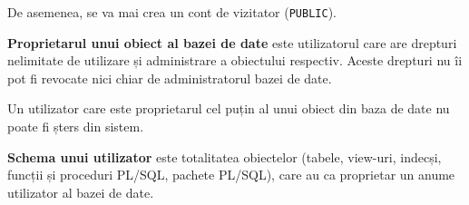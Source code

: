 De asemenea, se va mai crea un cont de vizitator (\texttt{PUBLIC}).

\textbf{Proprietarul unui obiect al bazei de date} este utilizatorul
care are drepturi nelimitate de utilizare și administrare a obiectului
respectiv. Aceste drepturi nu îi pot fi revocate nici chiar de administratorul
bazei de date.

Un utilizator care este proprietarul cel puțin al unui obiect din baza
de date nu poate fi șters din sistem.

\textbf{Schema unui utilizator} este totalitatea obiectelor (tabele,
view-uri, indecși, funcții și proceduri PL/SQL, pachete PL/SQL), care au
ca proprietar un anume utilizator al bazei de date.



